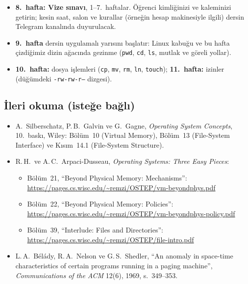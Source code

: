 \documentclass[11pt,a4paper]{article}
\newcommand{\cmd}[1]{\texttt{#1}}
\begin{document}
\begin{itemize}
  \item \textbf{8.\ hafta: Vize sınavı}, 1--7.\ haftalar. Öğrenci kimliğinizi ve kaleminizi getirin; kesin saat, salon ve kurallar (örneğin hesap makinesiyle ilgili) dersin Telegram kanalında duyurulacak.
  \item \textbf{9.\ hafta} dersin uygulamalı yarısını başlatır: Linux kabuğu ve bu hafta çizdiğimiz dizin ağacında gezinme (\cmd{pwd}, \cmd{cd}, \cmd{ls}, mutlak ve göreli yollar).
  \item \textbf{10.\ hafta:} dosya işlemleri (\cmd{cp}, \cmd{mv}, \cmd{rm}, \cmd{ln}, \cmd{touch}); \textbf{11.\ hafta:} izinler (düğümdeki \texttt{-rw-rw-r--} dizgesi).
\end{itemize}

\subsection*{İleri okuma (isteğe bağlı)}
\begin{itemize}
  \item A.\ Silberschatz, P.\,B.\ Galvin ve G.\ Gagne, \emph{Operating System Concepts}, 10.\ baskı, Wiley: Bölüm~10 (Virtual Memory), Bölüm~13 (File-System Interface) ve Kısım~14.1 (File-System Structure).
  \item R.\,H.\ ve A.\,C.\ Arpaci-Dusseau, \emph{Operating Systems: Three Easy Pieces}:
  \begin{itemize}
    \item Bölüm~21, ``Beyond Physical Memory: Mechanisms'': \url{https://pages.cs.wisc.edu/~remzi/OSTEP/vm-beyondphys.pdf}
    \item Bölüm~22, ``Beyond Physical Memory: Policies'': \url{https://pages.cs.wisc.edu/~remzi/OSTEP/vm-beyondphys-policy.pdf}
    \item Bölüm~39, ``Interlude: Files and Directories'': \url{https://pages.cs.wisc.edu/~remzi/OSTEP/file-intro.pdf}
  \end{itemize}
  \item L.\,A.\ Bélády, R.\,A.\ Nelson ve G.\,S.\ Shedler, ``An anomaly in space-time characteristics of certain programs running in a paging machine'', \emph{Communications of the ACM} 12(6), 1969, s.~349--353.
\end{itemize}
\end{document}
